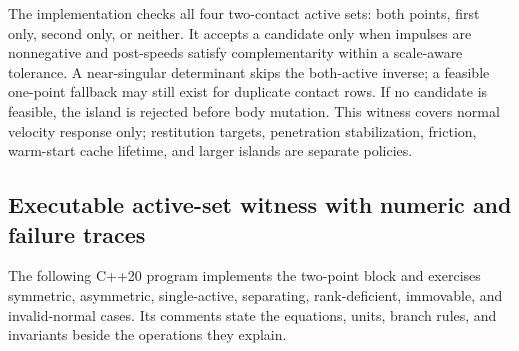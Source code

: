 The implementation checks all four two-contact active sets: both points, first only, second only, or neither. It accepts a candidate only when impulses are nonnegative and post-speeds satisfy complementarity within a scale-aware tolerance. A near-singular determinant skips the both-active inverse; a feasible one-point fallback may still exist for duplicate contact rows. If no candidate is feasible, the island is rejected before body mutation. This witness covers normal velocity response only; restitution targets, penetration stabilization, friction, warm-start cache lifetime, and larger islands are separate policies.

\subsection{Executable active-set witness with numeric and failure traces}\label{06-engine-ii-ch040-executable-active-set-witness-with-numeric-and-failure-traces}

\hypertarget{06-engine-ii-ch040-executable-active-set-witness-with-numeric-and-failure-traces}{}

The following C++20 program implements the two-point block and exercises symmetric, asymmetric, single-active, separating, rank-deficient, immovable, and invalid-normal cases. Its comments state the equations, units, branch rules, and invariants beside the operations they explain.

